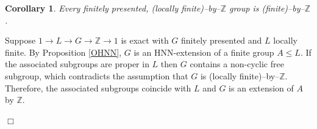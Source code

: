 \documentclass[12pt]{article}
\newtheorem{corollary}[theorem]{Corollary}
\newenvironment{proof}{\addvspace{12pt}\noindent{\bf Proof:}}{
$\Box$\par\addvspace{12pt}}
\begin{document}
\begin{corollary} \label{OsHNN} 
Every finitely presented, (locally finite)--by--$\mathbb Z$ group is (finite)--by--$\mathbb Z$.
\end{corollary}

\begin{proof}
Suppose  $1\to L\to G\to\mathbb Z\to 1$ is exact with $G$ finitely presented and $L$ locally finite. By Proposition \ref{OHNN}, $G$ is an HNN-extension of a finite group $A\leq L$. If the associated subgroups are proper in $L$ then $G$ contains a non-cyclic free subgroup, which contradicts the assumption that $G$ is (locally finite)--by--$\mathbb Z$. Therefore, the associated subgroups coincide with $L$ and $G$ is an extension of $A$ by $\mathbb Z$.
\end{proof}
\end{document}
